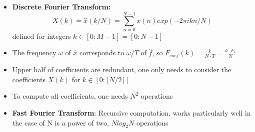 \documentclass{scrartcl}
\newcommand{\ffrac}[2]{\ensuremath{\frac{\displaystyle #1}{\displaystyle #2}}}
\begin{document}
\begin{itemize}
\begin{enumerate}
        \end{enumerate}
    \item
        \textbf{Discrete Fourier Transform:}
        $$ X(k) = \hat{x}(k/N) = \sum_{n=0}^{N-1} x(n) exp(-2\pi i k n/N)$$
        defined for integers $k \in [0: M-1] = [0 : N-1]$
    \item
        The frequency $\omega$ of $\hat{x}$ corresponds to $\omega/T$ of $\hat{f}$, so $F_{coef}(k) = \ffrac{k}{N \cdot T} = \ffrac{k \cdot F_s}{N}$
    \item
        Upper half of coefficients are redundant, one only needs to consider the coefficients $X(k)$ for $k \in [0: \lfloor N/2 \rfloor]$
    \item
        To compute all coefficients, one needs $N^2$ operations
    \item
        \textbf{Fast Fourier Transform}: Recursive computation, works particularly well in the case of N is a power of two, $Nlog_2N$ operations
\end{itemize}
\end{document}
